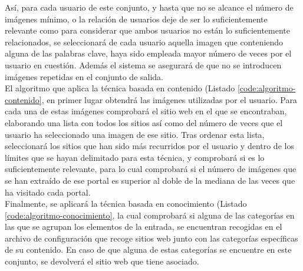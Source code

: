 Así, para cada usuario de este conjunto, y hasta que no se alcance el número de imágenes mínimo, o la relación de usuarios deje de ser lo suficientemente relevante como para considerar que ambos usuarios no están lo suficientemente relacionados, se seleccionará de cada usuario aquella imagen que conteniendo alguna de las palabras clave, haya sido empleada mayor número de veces por el usuario en cuestión. Además el sistema se asegurará de que no se introducen imágenes repetidas en el conjunto de salida.\\




El algoritmo que aplica la técnica basada en contenido (Listado \ref{code:algoritmo-contenido}, en primer lugar obtendrá las imágenes utilizadas por el usuario. Para cada una de estas imágenes comprobará el sitio web en el que se encontraban, elaborando una lista con todos los sitios así como del número de veces que el usuario ha seleccionado una imagen de ese sitio. Tras ordenar esta lista, seleccionará los sitios que han sido más recurridos por el usuario y dentro de los límites que se hayan delimitado para esta técnica, y comprobará si es lo suficientemente relevante, para lo cual comprobará si el número de imágenes que se han extraído de ese portal es superior al doble de la mediana de las veces que ha visitado cada portal.\\



Finalmente, se aplicará la técnica basada en conocimiento (Listado \ref{code:algoritmo-conocimiento}, la cual comprobará si alguna de las categorías en las que se agrupan los elementos de la entrada, se encuentran recogidas en el archivo de configuración que recoge sitios web junto con las categorías específicas de su contenido. En caso de que alguna de estas categorías se encuentre en este conjunto, se devolverá el sitio web que tiene asociado.\\



